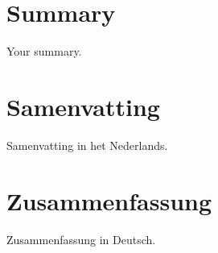 \chapter*{Summary}

Your summary.

\chapter*{Samenvatting}

{

  Samenvatting in het Nederlands.
}

\chapter*{Zusammenfassung}

{

  Zusammenfassung in Deutsch.
}




